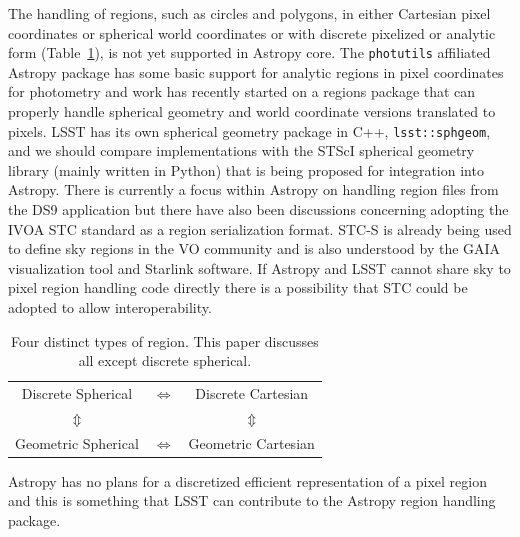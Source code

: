 \documentclass[]{spie}  %
\begin{document}
The handling of regions, such as circles and polygons, in either Cartesian pixel coordinates or spherical world coordinates or with discrete pixelized or analytic form (Table~\ref{tab:regions}), is not yet supported in Astropy core.
The \texttt{photutils} affiliated Astropy package has some basic support for analytic regions in pixel coordinates for photometry and work has recently started on a regions package that can properly handle spherical geometry and world coordinate versions translated to pixels.
LSST has its own spherical geometry package in C++, \texttt{lsst::sphgeom}, and we should compare implementations with the STScI spherical geometry library (mainly written in Python) that is being proposed for integration into Astropy.
There is currently a focus within Astropy on handling region files from the DS9 application\cite{2005ASPC..347..110J} but there have also been discussions concerning adopting the IVOA STC standard\cite{2007ivoa.spec.1030R} as a region serialization format.
STC-S is already being used to define sky regions in the VO community and is also understood by the GAIA visualization tool\cite{2009ASPC..411..575D} and Starlink software\cite{2010ASPC..434..213B,2014ASPC..485..391C}.
If Astropy and LSST cannot share sky to pixel region handling code directly there is a possibility that STC could be adopted to allow interoperability.

\begin{table}[t]
\centering
\caption{Four distinct types of region. This paper discusses all except discrete spherical.}
\label{tab:regions}
\vspace{10pt}
\begin{tabular}{ccc}
  Discrete Spherical & $\Longleftrightarrow$ & Discrete Cartesian \\
  $\Updownarrow$ & &  $\Updownarrow$ \\
  Geometric Spherical & $\Longleftrightarrow$ & Geometric Cartesian \\
\end{tabular}
\end{table}

Astropy has no plans for a discretized efficient representation of a pixel region and this is something that LSST can contribute to the Astropy region handling package.
\end{document}
